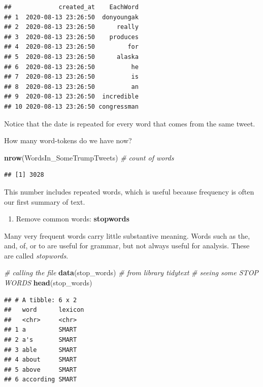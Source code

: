 \documentclass[
]{article}
\newenvironment{Shaded}{\begin{snugshade}}{\end{snugshade}}
\newcommand{\CommentTok}[1]{\textcolor[rgb]{0.56,0.35,0.01}{\textit{#1}}}
\newcommand{\FunctionTok}[1]{\textcolor[rgb]{0.13,0.29,0.53}{\textbf{#1}}}
\newcommand{\NormalTok}[1]{#1}
\providecommand{\tightlist}{%
  \setlength{\itemsep}{0pt}\setlength{\parskip}{0pt}}
\begin{document}
\begin{verbatim}
##             created_at    EachWord
## 1  2020-08-13 23:26:50  donyoungak
## 2  2020-08-13 23:26:50      really
## 3  2020-08-13 23:26:50    produces
## 4  2020-08-13 23:26:50         for
## 5  2020-08-13 23:26:50      alaska
## 6  2020-08-13 23:26:50          he
## 7  2020-08-13 23:26:50          is
## 8  2020-08-13 23:26:50          an
## 9  2020-08-13 23:26:50  incredible
## 10 2020-08-13 23:26:50 congressman
\end{verbatim}

Notice that the date is repeated for every word that comes from the same
tweet.

How many word-tokens do we have now?

\begin{Shaded}
\begin{Highlighting}[]
\FunctionTok{nrow}\NormalTok{(WordsIn\_SomeTrumpTweets) }\CommentTok{\# count of words}
\end{Highlighting}
\end{Shaded}

\begin{verbatim}
## [1] 3028
\end{verbatim}

This number includes repeated words, which is useful because frequency
is often our first summary of text.

\begin{enumerate}
\def\labelenumi{\arabic{enumi}.}
\setcounter{enumi}{3}
\tightlist
\item
  Remove common words: \textbf{stopwords}
\end{enumerate}

Many very frequent words carry little substantive meaning. Words such as
the, and, of, or to are useful for grammar, but not always useful for
analysis. These are called \emph{stopwords}.

\begin{Shaded}
\begin{Highlighting}[]
\CommentTok{\# calling the file }
\FunctionTok{data}\NormalTok{(stop\_words) }\CommentTok{\# from library \textquotesingle{}tidytext\textquotesingle{}}
\CommentTok{\# seeing some \textquotesingle{}STOP WORDS\textquotesingle{}  }
\FunctionTok{head}\NormalTok{(stop\_words)}
\end{Highlighting}
\end{Shaded}

\begin{verbatim}
## # A tibble: 6 x 2
##   word      lexicon
##   <chr>     <chr>  
## 1 a         SMART  
## 2 a's       SMART  
## 3 able      SMART  
## 4 about     SMART  
## 5 above     SMART  
## 6 according SMART
\end{verbatim}
\end{document}
